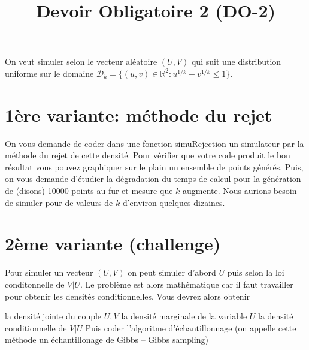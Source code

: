 \documentclass{article}
\title{Devoir Obligatoire 2 (DO-2)}
\begin{document}

On veut simuler selon le vecteur aléatoire $(U, V)$ qui suit une distribution uniforme 
sur le domaine $\mathcal{D}_k = \lbrace (u, v) \in \mathbb{R}^2 : u^{1/k} + v^{1/k} \leq 1 \rbrace$.

\section{1ère variante: méthode du rejet}

On vous demande de coder dans une fonction simuRejection un simulateur par la méthode du rejet de cette densité. 
Pour vérifier que votre code produit le bon résultat vous pouvez graphiquer sur le plain un ensemble de points générés.
Puis, on vous demande d'étudier la dégradation du temps de calcul pour la génération de (disons) 10000 points au fur et 
mesure que $k$ augmente. Nous aurions besoin de simuler pour de valeurs de $k$ d'environ quelques dizaines.

\section{2ème variante (challenge)}

Pour simuler un vecteur $(U, V)$ on peut simuler d'abord $U$ puis selon la loi conditonnelle de $V|U$. 
Le problème est alors mathématique car il faut travailler pour obtenir les densités conditionnelles.
Vous devrez alors obtenir

la densité jointe du couple $U, V$
la densité marginale de la variable $U$
la densité conditionnelle de $V|U$
Puis coder l'algoritme d'échantillonnage (on appelle cette méthode un échantillonage de Gibbs -- Gibbs sampling)
\end{document}
